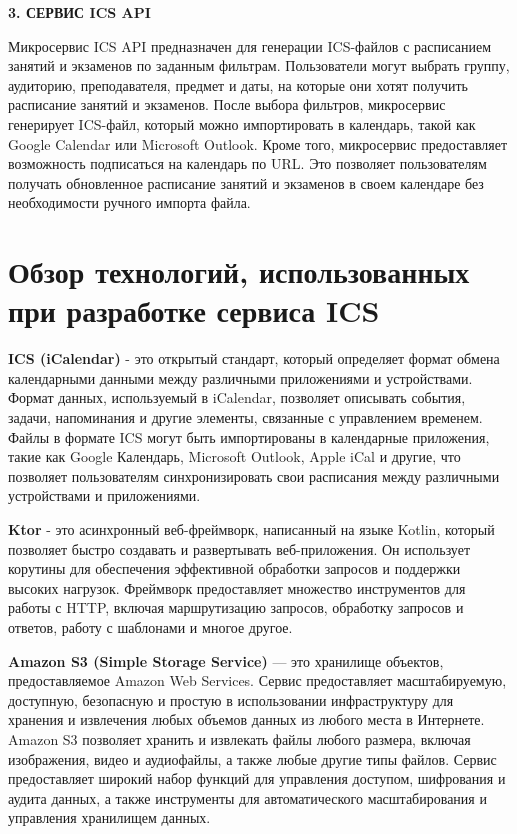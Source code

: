 
\newpage
\begin{center}
    \textbf{\large 3. СЕРВИС ICS API}
\end{center}

Микросервис ICS API предназначен для генерации ICS-файлов с расписанием занятий 
и экзаменов по заданным фильтрам. Пользователи могут выбрать группу, аудиторию, 
преподавателя, предмет и даты, на которые они хотят получить расписание занятий и экзаменов. 
После выбора фильтров, микросервис генерирует ICS-файл, который можно импортировать в календарь, 
такой как Google Calendar или Microsoft Outlook. Кроме того, микросервис предоставляет возможность 
подписаться на календарь по URL. Это позволяет пользователям получать обновленное расписание занятий 
и экзаменов в своем календаре без необходимости ручного импорта файла.

\section{Обзор технологий, использованных при разработке сервиса ICS}

\textbf{ICS (iCalendar)} - это открытый стандарт, 
который определяет формат обмена календарными данными между различными приложениями и устройствами. 
Формат данных, используемый в iCalendar, позволяет описывать события, задачи, напоминания и другие элементы, 
связанные с управлением временем. Файлы в формате ICS могут быть импортированы в календарные приложения, 
такие как Google Календарь, Microsoft Outlook, Apple iCal и другие, 
что позволяет пользователям синхронизировать свои расписания между различными устройствами и приложениями.

\textbf{Ktor} - это асинхронный веб-фреймворк, написанный на языке Kotlin, 
который позволяет быстро создавать и развертывать веб-приложения.
Он использует корутины для обеспечения эффективной обработки запросов и поддержки высоких нагрузок. 
Фреймворк предоставляет множество инструментов для работы с HTTP, 
включая маршрутизацию запросов, обработку запросов и ответов, работу с шаблонами и многое другое.

\textbf{Amazon S3 (Simple Storage Service)} — это хранилище объектов, предоставляемое Amazon Web Services. 
Сервис предоставляет масштабируемую, доступную, безопасную и простую в использовании инфраструктуру для хранения 
и извлечения любых объемов данных из любого места в Интернете. 
Amazon S3 позволяет хранить и извлекать файлы любого размера, включая изображения, 
видео и аудиофайлы, а также любые другие типы файлов. 
Сервис предоставляет широкий набор функций для управления доступом, шифрования и аудита данных, 
а также инструменты для автоматического масштабирования и управления хранилищем данных.


